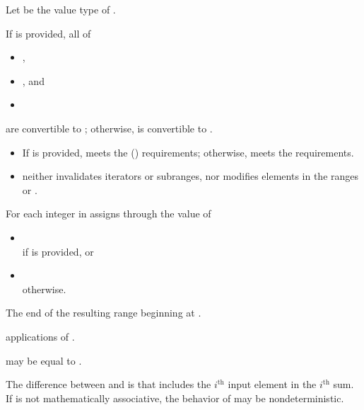 \begin{itemdescr}
\pnum
Let  be the value type of .

\pnum
\mandates
If  is provided, all of
\begin{itemize}
\item {},
\item {}, and
\item {}
\end{itemize}
are convertible to ;
otherwise, 
is convertible to .

\pnum
\expects
\begin{itemize}
\item
  If  is provided,
   meets the  () requirements;
  otherwise, 
  meets the  requirements.
\item
   neither invalidates iterators or subranges,
  nor modifies elements in
  the ranges  or .
\end{itemize}

\pnum
\effects
For each integer  in 
assigns through  the value of
\begin{itemize}
\item
  \\if {} is provided, or
\item
  \\otherwise.
\end{itemize}

\pnum
\returns
The end of the resulting range beginning at .

\pnum
\complexity
{} applications of .

\pnum
\remarks
{} may be equal to .

\pnum
\begin{note}
The difference between  and  is
that  includes the $i^\text{th}$ input element
in the $i^\text{th}$ sum.
If  is not mathematically associative,
the behavior of  may be nondeterministic.
\end{note}
\end{itemdescr}

